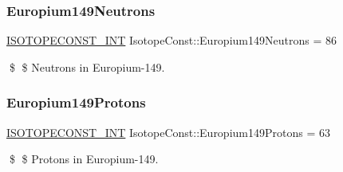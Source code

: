 \subsubsection{\texorpdfstring{Europium149\+Neutrons}{Europium149Neutrons}}
{\footnotesize\ttfamily \mbox{\hyperlink{group___isotope_const-_macros_ga5f18360b3e99483a35c32d789e62621c}{I\+S\+O\+T\+O\+P\+E\+C\+O\+N\+S\+T\+\_\+\+I\+NT}} Isotope\+Const\+::\+Europium149\+Neutrons = 86}

\$ \$ Neutrons in Europium-\/149. \mbox{\label{group___isotope_const-_europium-_eu149_gaa5070544d2b40e56c9835db8cab260b2}} 
\subsubsection{\texorpdfstring{Europium149\+Protons}{Europium149Protons}}
{\footnotesize\ttfamily \mbox{\hyperlink{group___isotope_const-_macros_ga5f18360b3e99483a35c32d789e62621c}{I\+S\+O\+T\+O\+P\+E\+C\+O\+N\+S\+T\+\_\+\+I\+NT}} Isotope\+Const\+::\+Europium149\+Protons = 63}

\$ \$ Protons in Europium-\/149. 